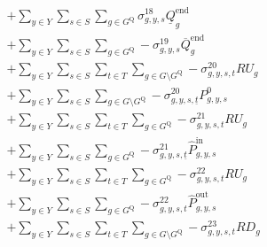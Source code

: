 \documentclass{article}
\newcommand{\sGenerators}{G}
\newcommand{\sStorage}{G^{\mathrm{Q}}}
\newcommand{\sStorageCandidate}{G^{\mathrm{C,Q}}}
\newcommand{\sYears}{Y}
\newcommand{\sScenarios}{S}
\newcommand{\sIntervals}{T}
\newcommand{\sZones}{Z}
\newcommand{\iGenerator}{g}
\newcommand{\iYear}{y}
\newcommand{\iScenario}{s}
\newcommand{\iInterval}{t}
\newcommand{\iIntervalStart}{\underline{\iInterval}}
\newcommand{\iZone}{z}
\newcommand{\cRampRateUp}[1][\iGenerator]{RU_{#1}}
\newcommand{\cRampRateDown}[1][\iGenerator]{RD_{#1}}
\newcommand{\cStorageUnitEnergyIntervalEndMax}[1][\iGenerator]{\overline{Q}^{\mathrm{end}}_{#1}}
\newcommand{\cStorageUnitEnergyIntervalEndMin}[1][\iGenerator]{\underline{Q}^{\mathrm{end}}_{#1}}
\newcommand{\cPowerInitial}[1][\iGenerator,\iYear,\iScenario]{P_{#1}^{0}}
\newcommand{\cPowerOutInitial}[1][\iGenerator,\iYear,\iScenario]{\hat{P}_{#1}^{\mathrm{out}}}
\newcommand{\cPowerInInitial}[1][\iGenerator,\iYear,\iScenario]{\hat{P}_{#1}^{\mathrm{in}}}
\newcommand{\vStorageUnitEnergy}[1][\iGenerator,\iYear,\iScenario,\iInterval]{q_{#1}}
\newcommand{\vLostLoadPower}[1][\iZone,\iYear,\iScenario,\iInterval]{p^{\mathrm{V}}_{#1}}
\newcommand{\vInstalledCapacityTotal}[1][\iGenerator,\iYear]{a_{#1}}
\newcommand{\dMaxStorageEnergyCandidate}[1][\iGenerator,\iYear,\iScenario,\iInterval]{\sigma_{#1}^{17}}
\newcommand{\dMinStorageEnergyIntervalEnd}[1][\iGenerator,\iYear,\iScenario]{\sigma_{#1}^{18}}
\newcommand{\dMaxStorageEnergyIntervalEnd}[1][\iGenerator,\iYear,\iScenario]{\sigma_{#1}^{19}}
\newcommand{\dRampRateUp}[1][\iGenerator,\iYear,\iScenario,\iInterval]{\sigma_{#1}^{20}}
\newcommand{\dRampRateUpStorageCharging}[1][\iGenerator,\iYear,\iScenario,\iInterval]{\sigma_{#1}^{21}}
\newcommand{\dRampRateUpStorageDischarging}[1][\iGenerator,\iYear,\iScenario,\iInterval]{\sigma_{#1}^{22}}
\newcommand{\dRampRateDown}[1][\iGenerator,\iYear,\iScenario,\iInterval]{\sigma_{#1}^{23}}
\newcommand{\dNonNegativeLostLoad}[1][\iZone,\iYear,\iScenario,\iInterval]{\sigma_{#1}^{26}}
\begin{document}
\begin{align}
& + \sum\limits_{\iYear \in \sYears}\sum\limits_{\iScenario \in \sScenarios} \sum\limits_{\iGenerator \in \sStorage} \dMinStorageEnergyIntervalEnd \cStorageUnitEnergyIntervalEndMin\\
& + \sum\limits_{\iYear \in \sYears}\sum\limits_{\iScenario \in \sScenarios} \sum\limits_{\iGenerator \in \sStorage} - \dMaxStorageEnergyIntervalEnd \cStorageUnitEnergyIntervalEndMax\\
%
& + \sum\limits_{\iYear \in \sYears}\sum\limits_{\iScenario \in \sScenarios}\sum\limits_{\iInterval \in \sIntervals} \sum\limits_{\iGenerator \in \sGenerators \setminus \sStorage} - \dRampRateUp \cRampRateUp\\
& + \sum\limits_{\iYear \in \sYears}\sum\limits_{\iScenario \in \sScenarios} \sum\limits_{\iGenerator \in \sGenerators \setminus \sStorage} - \dRampRateUp[\iGenerator,\iYear,\iScenario,\iIntervalStart] \cPowerInitial\\
%
& + \sum\limits_{\iYear \in \sYears}\sum\limits_{\iScenario \in \sScenarios}\sum\limits_{\iInterval \in \sIntervals} \sum\limits_{\iGenerator \in \sStorage} - \dRampRateUpStorageCharging \cRampRateUp\\
& + \sum\limits_{\iYear \in \sYears}\sum\limits_{\iScenario \in \sScenarios} \sum\limits_{\iGenerator \in \sStorage} - \dRampRateUpStorageCharging[\iGenerator,\iYear,\iScenario,\iIntervalStart] \cPowerInInitial\\
%
& + \sum\limits_{\iYear \in \sYears}\sum\limits_{\iScenario \in \sScenarios}\sum\limits_{\iInterval \in \sIntervals} \sum\limits_{\iGenerator \in \sStorage} - \dRampRateUpStorageDischarging \cRampRateUp\\
& + \sum\limits_{\iYear \in \sYears}\sum\limits_{\iScenario \in \sScenarios} \sum\limits_{\iGenerator \in \sStorage} - \dRampRateUpStorageDischarging \cPowerOutInitial\\
& + \sum\limits_{\iYear \in \sYears}\sum\limits_{\iScenario \in \sScenarios}\sum\limits_{\iInterval \in \sIntervals} \sum\limits_{\iGenerator \in \sGenerators \setminus \sStorage} - \dRampRateDown \cRampRateDown\\

\end{align}
\end{document}
